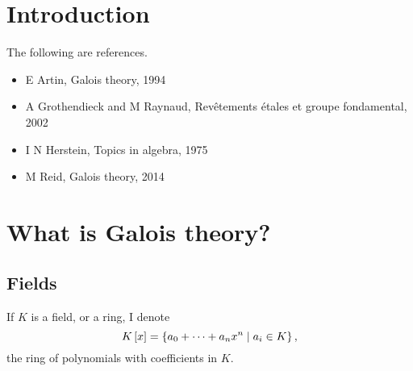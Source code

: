 \def\module{M3P11 Galois Theory}
\def\lecturer{Prof Alessio Corti}
\def\term{Spring 2019}

\def\thm{section}







\section{Introduction}


The following are references.
\begin{itemize}
\item E Artin, Galois theory, 1994
\item A Grothendieck and M Raynaud, Rev\^etements \'etales et groupe fondamental, 2002
\item I N Herstein, Topics in algebra, 1975
\item M Reid, Galois theory, 2014
\end{itemize}

\pagebreak

\section{What is Galois theory?}

\subsection{Fields}

\begin{notation}
If $ K $ is a field, or a ring, I denote
$$ K\left[ x \right] = \left\{ a_0 + \dots + a_nx^n \mid a_i \in K \right\}, $$
the ring of polynomials with coefficients in $ K $.
\end{notation}

